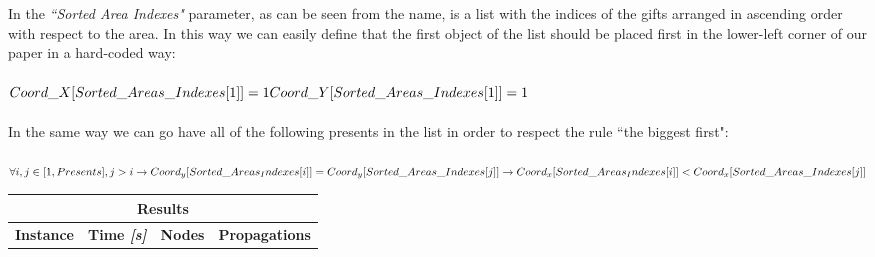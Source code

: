 In the \textit{``Sorted Area Indexes"} parameter, as can be seen from the name, is a list with the indices of the gifts arranged in ascending order with respect to the area.
In this way we can easily define that the first object of the list should be placed first in the lower-left corner of our paper in a hard-coded way:\\ \\
$
Coord\_X[Sorted\_Areas\_Indexes[1]] = 1\\
Coord\_Y[Sorted\_Areas\_Indexes[1]] = 1
$
\\ \\
In the same way we can go have all of the following presents in the list in order to respect the rule ``the biggest first":\\ \\
$
\forall i, j \in [1, Presents], j > i \rightarrow \\
Coord_y[Sorted\_Areas_Indexes[i]] = Coord_y[Sorted\_Areas\_Indexes[j]] \rightarrow \\
Coord_x[Sorted\_Areas_Indexes[i]] < Coord_x[Sorted\_Areas\_Indexes[j]]
$
\\


\begin{center}
    \begin{tabular}{|c|c|c|c|}
        \hline
        \multicolumn{4}{|c|}{\textbf{Results}} \\
        \hline
        \textbf{Instance} & \textbf{Time \textit{[s]}} & \textbf{Nodes} & \textbf{Propagations} \\
        \hline
    \end{tabular}
\end{center}

